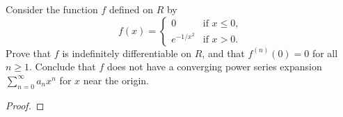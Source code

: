 \documentclass[../hw1]{subfiles}
\begin{document}
\begin{problem}
Consider the function $f$ defined on $R$ by \[
	f(x) = \begin{cases}
		0            & \text{if } x\le 0, \\
		e^{-1 / x^2} & \text{if } x > 0.
	\end{cases}
\]
Prove that $f$ is indefinitely differentiable on $R$, and that $f^{(n)}(0)=0$ for all $n\ge 1$.
Conclude that $f$ does not have a converging power series expansion $\sum_{n=0}^{\infty} a_n x^n$ for $x$ near the origin.
\end{problem}
\begin{proof}

\end{proof}
\end{document}

